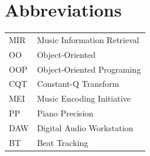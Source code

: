 \chapter*{Abbreviations}

\begin{flushleft}
\begin{tabular}{l p{0.8\linewidth}}
MIR      & Music Information Retrieval\\
OO       & Object-Oriented \\
OOP      & Object-Oriented Programing\\
CQT      & Constant-Q Transform\\
MEI      & Music Encoding Initiative\\ 
PP & Piano Precision\\ 
DAW      & Digital Audio Workstation\\
BT       & Beat Tracking\\        

\end{tabular}
\end{flushleft}

